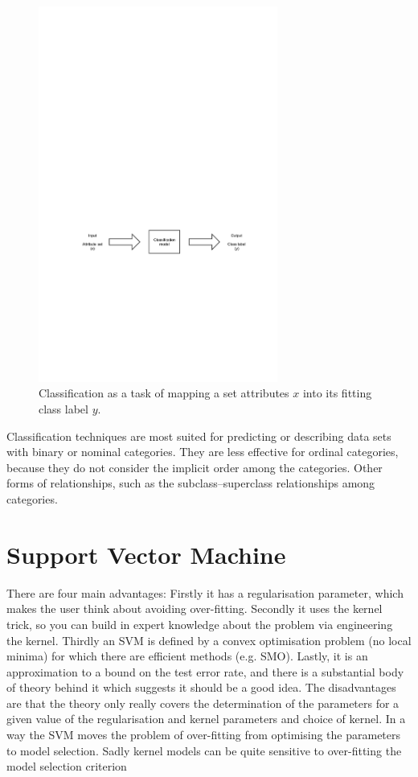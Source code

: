 \begin{figure}[!htp]
  \center
  \includegraphics[width=0.7\textwidth]{figures/classification}
  \caption{Classification as a task of mapping a set attributes $x$ into its fitting class label $y$.}
  \label{fig:classification_task}
\end{figure}

\FloatBarrier

Classification techniques are most suited for predicting or describing data sets with binary or nominal categories. They are less effective for ordinal categories, because they do not consider the implicit order among the categories. Other forms of relationships, such as the subclass–superclass relationships among categories.

\section{Support Vector Machine}

There are four main advantages: Firstly it has a regularisation parameter, which makes the user think about avoiding over-fitting. Secondly it uses the kernel trick, so you can build in expert knowledge about the problem via engineering the kernel. Thirdly an SVM is defined by a convex optimisation problem (no local minima) for which there are efficient methods (e.g. SMO). Lastly, it is an approximation to a bound on the test error rate, and there is a substantial body of theory behind it which suggests it should be a good idea.
The disadvantages are that the theory only really covers the determination of the parameters for a given value of the regularisation and kernel parameters and choice of kernel. In a way the SVM moves the problem of over-fitting from optimising the parameters to model selection. Sadly kernel models can be quite sensitive to over-fitting the model selection criterion \cite{cawley2010over}

